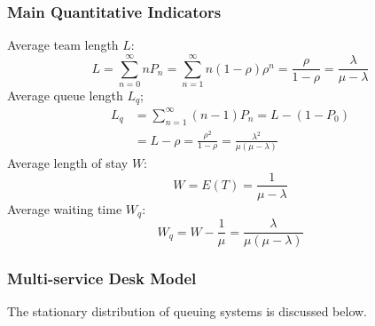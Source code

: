 \documentclass{mcmthesis}
\begin{document}
\subsubsection*{Main Quantitative Indicators}
\par Average team length $L$:
\begin{equation}
			L = \sum \limits_{n = 0}^\infty n P_n = \sum \limits_{n = 1}^\infty n (1 - \rho) \rho^n 
	 	  = \frac{\rho}{1-\rho} = \frac{\lambda}{\mu - \lambda}
\end{equation}
Average queue length $L_q$;
\begin{equation}
\begin{split}
	L_q & = \sum \limits_{n=1}^\infty (n-1)P_n = L - (1 - P_0) \\
	& = L - \rho = \frac{\rho^2}{1-\rho} = \frac{\lambda^2}{\mu(\mu - \lambda)}
\end{split}
\end{equation}
Average length of stay $W$:
\begin{equation}
	W = E(T) = \frac{1}{\mu - \lambda}
\end{equation}
Average waiting time $W_q$:
\begin{equation}
	W_q = W - \frac{1}{\mu} = \frac{\lambda}{\mu(\mu - \lambda)}
\end{equation}

\subsubsection{Multi-service Desk Model}

\par The stationary distribution of queuing systems is discussed below.
\end{document}
